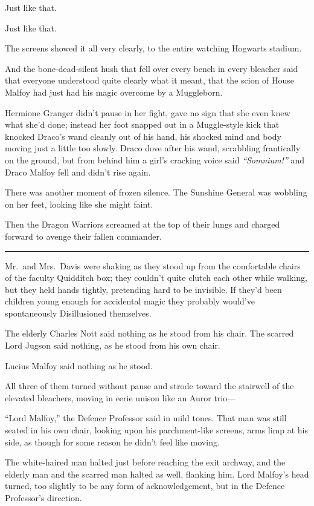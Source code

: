 Just like that.

Just like that.

The screens showed it all very clearly, to the entire watching Hogwarts
stadium.

And the bone-dead-silent hush that fell over every bench in every
bleacher said that everyone understood quite clearly what it meant, that
the scion of House Malfoy had just had his magic overcome by a
Muggleborn.

Hermione Granger didn't pause in her fight, gave no sign that she even
knew what she'd done; instead her foot snapped out in a Muggle-style
kick that knocked Draco's wand cleanly out of his hand, his shocked mind
and body moving just a little too slowly. Draco dove after his wand,
scrabbling frantically on the ground, but from behind him a girl's
cracking voice said \emph{``Somnium!''} and Draco Malfoy fell and didn't
rise again.

There was another moment of frozen silence. The Sunshine General was
wobbling on her feet, looking like she might faint.

Then the Dragon Warriors screamed at the top of their lungs and charged
forward to avenge their fallen commander.

\begin{center}\rule{3in}{0.4pt}\end{center}

Mr.~and Mrs.~Davis were shaking as they stood up from the comfortable
chairs of the faculty Quidditch box; they couldn't quite clutch each
other while walking, but they held hands tightly, pretending hard to be
invisible. If they'd been children young enough for accidental magic
they probably would've spontaneously Disillusioned themselves.

The elderly Charles Nott said nothing as he stood from his chair. The
scarred Lord Jugson said nothing, as he stood from his own chair.

Lucius Malfoy said nothing as he stood.

All three of them turned without pause and strode toward the stairwell
of the elevated bleachers, moving in eerie unison like an Auror trio---

``Lord Malfoy,'' the Defence Professor said in mild tones. That man was
still seated in his own chair, looking upon his parchment-like screens,
arms limp at his side, as though for some reason he didn't feel like
moving.

The white-haired man halted just before reaching the exit archway, and
the elderly man and the scarred man halted as well, flanking him. Lord
Malfoy's head turned, too slightly to be any form of acknowledgement,
but in the Defence Professor's direction.


